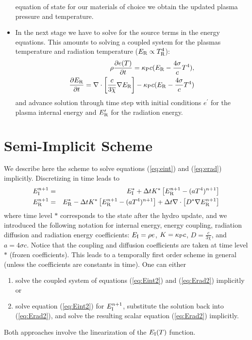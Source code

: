 \documentclass[12pt]{article}
\newcommand{\Eint}{E_{\rm I}}
\newcommand{\Erad}{E_{\rm R}}
\newcommand{\kappaP}{\kappa_{\rm P}}
\begin{document}
\begin{itemize}
equation of state for our materials of choice we obtain the updated plasma 
pressure and temperature.   
\item In the next stage we have to solve for the source terms in the energy 
equations. This amounts to solving a coupled system for the plasmas 
temperature and radiation temperature ($\Erad \propto T_{\rm R}^4$): 
\begin{eqnarray}
\rho \frac{\partial e(T)}{\partial t} = 
 \kappaP c (\Erad - \frac{4\sigma}{c} T^4), \label{eq:eint}\\ 
\frac{\partial \Erad}{\partial t} = \nabla\cdot\left[ 
  \frac{c}{ 3\overline{\chi} } \nabla \Erad \right]   - 
 \kappaP c (\Erad - \frac{4\sigma}{c} T^4)  \label{eq:erad}
\end{eqnarray} 
and advance solution through time step with initial conditions 
$e^\prime$ for the plasma internal energy and $\Erad^\prime$ for the 
radiation energy.  
\end{itemize}  

\section{Semi-Implicit Scheme}

We describe here the scheme to solve equations 
(\ref{eq:eint}) and (\ref{eq:erad}) implicitly. 
Discretizing in time leads to
\begin{eqnarray}
\Eint^{n+1} &=& \Eint^* + \Delta t K^*\left[\Erad^{n+1} - (aT^4)^{n+1}\right]  
   \label{eq:Eint2}\\
\Erad^{n+1} &=& \Erad^* - \Delta t K^*\left[\Erad^{n+1} - (aT^4)^{n+1}\right]
                + \Delta t \nabla\cdot\left[ D^* \nabla \Erad^{n+1} \right]
   \label{eq:Erad2}
\end{eqnarray}
where time level $*$ corresponds to the state after the hydro update,
and we introduced the following notation for
internal energy, energy coupling, radiation diffusion and radiation
energy coefficients:
$\Eint = \rho e$, $K = \kappaP c$, $D = \frac{c}{ 3\overline{\chi}}$,
and $a = 4\sigma c$.
Notice that the coupling and diffusion coefficients are taken at time
level $*$ (frozen coefficients). This leads to a temporally first order
scheme in general (unless the coefficients are constants in time).
One can either 
\begin{enumerate}
\item solve the coupled system of equations (\ref{eq:Eint2})
      and (\ref{eq:Erad2}) implicitly or 
\item solve equation (\ref{eq:Eint2}) for $\Eint^{n+1}$,
      substitute the solution back into (\ref{eq:Erad2}), 
      and solve the resulting scalar equation (\ref{eq:Erad2})
      implicitly.
\end{enumerate}
Both approaches involve the linearization of the $\Eint(T)$ function.
\end{document}
